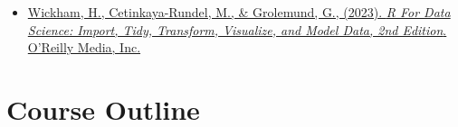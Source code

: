 \documentclass[11pt, letterpaper]{article}
\begin{document}
\begin{itemize}

\item \href{https://r4ds.hadley.nz/}{Wickham, H., Cetinkaya-Rundel, M., \& Grolemund, G., (2023). \textit{R For Data Science: Import, Tidy, Transform, Visualize, and Model Data, 2nd Edition}. O'Reilly Media, Inc.}










\end{itemize}



\section*{Course Outline}
\end{document}
